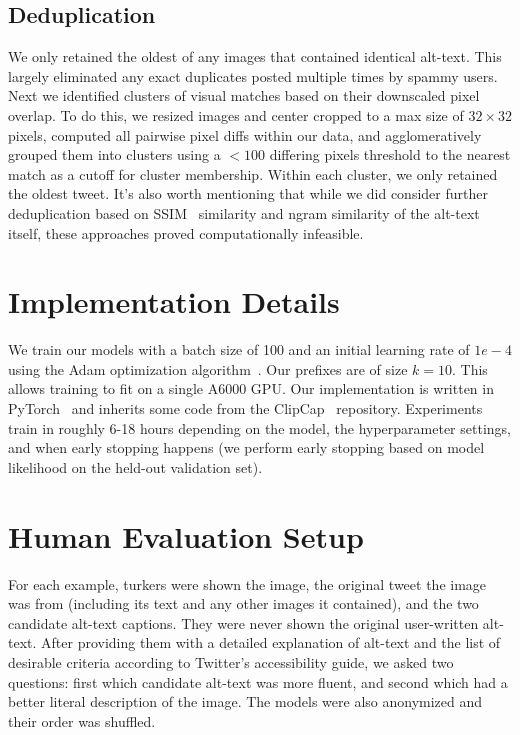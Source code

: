\documentclass{article} %
\begin{document}
\subsection{Deduplication}

We only retained the oldest of any images that contained identical alt-text.
This largely eliminated any exact duplicates posted multiple times by spammy users.
Next we identified clusters of visual matches based on their downscaled pixel overlap.
To do this, we resized images and center cropped to a max size of $32 \times 32$ pixels, computed all pairwise pixel diffs within our data, and agglomeratively grouped them into clusters using a $<100$ differing pixels threshold to the nearest match as a cutoff for cluster membership.
Within each cluster, we only retained the oldest tweet.
It's also worth mentioning that while we did consider further deduplication based on SSIM~\citep{ssim} similarity and ngram similarity of the alt-text itself, these approaches proved computationally infeasible.

\section{Implementation Details}
\label{sec:implementation}

We train our models with a batch size of 100 and an initial learning rate of $1e-4$ using the Adam optimization algorithm~\citep{adam}.
Our prefixes are of size $k=10$.
This allows training to fit on a single A6000 GPU.
Our implementation is written in PyTorch~\citep{pytorch} and inherits some code from the ClipCap~\citep{clipcap} repository.
Experiments train in roughly 6-18 hours depending on the model, the hyperparameter settings, and when early stopping happens (we perform early stopping based on model likelihood on the held-out validation set).

\section{Human Evaluation Setup}
\label{sec:human}

For each example, turkers were shown the image, the original tweet the image was from (including its text and any other images it contained), and the two candidate alt-text captions.
They were never shown the original user-written alt-text.
After providing them with a detailed explanation of alt-text and the list of desirable criteria according to Twitter's accessibility guide, we asked two questions: first which candidate alt-text was more fluent, and second which had a better literal description of the image.
The models were also anonymized and their order was shuffled.
\end{document}
